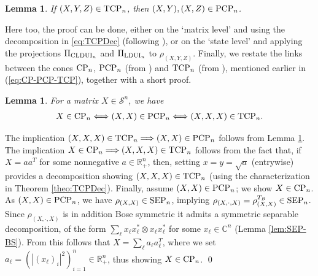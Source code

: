 \documentclass[11pt]{article}
\makeatletter
\newcommand{\R}{\ensuremath{\mathbb{R}}}   %
\newcommand{\C}{\ensuremath{\mathbb{C}}} %
\newcommand{\MS}{{\mathcal S}}
\newcommand{\PCP}{\text{\rm PCP}}
\newcommand{\TCP}{\text{\rm TCP}}
\newcommand{\SEP}{\text{\rm SEP}}
\newcommand{\CP}{\text{\rm CP}}
\newcommand{\CLDUI}{\text{\rm CLDUI}}
\newcommand{\LDUI}{\text{\rm LDUI}}
\newcommand{\ot}{\otimes}
\theoremstyle{plain}
\newtheorem{lemma}[satz]{Lemma}
\renewenvironment{proof}[1][\proofname]{%
  \par
  \pushQED{}%
  \normalfont
  \topsep6\p@\@plus6\p@
  \trivlist
  \item[\hskip\labelsep\itshape #1\@addpunct{.}]%
}{%
  \popQED
  \endtrivlist
}
\makeatother
\begin{document}
\begin{lemma}\label{lem:necCondTCP}\cite{SN-CLDUI}
    If $(X,Y,Z)\in \TCP_n$, then $(X,Y), (X,Z) \in\PCP_n$.%
\end{lemma}

Here too, the  proof can  be done, either  on the `matrix level'  and using the decomposition in \eqref{eq:TCPDec} (following \cite{SN-CLDUI}), 
or on the `state level' and applying the projections $\Pi_{\CLDUI_n}$ and $\Pi_{\LDUI_n}$ to $\rho_{(X,Y,Z)}$. %
Finally, we restate the links between the cones $\CP_n$, $\PCP_n$ (from \cite{JML-PCP}) and $\TCP_n$ (from \cite{SN-CLDUI}), mentioned earlier in (\ref{eq:CP-PCP-TCP}), together with a short proof. 

\begin{lemma}\label{lem:CP-PCP-TCP} \cite{SN-CLDUI}
For a matrix $X\in\MS^n$, we have 
\begin{align*}
X\in\CP_n \Longleftrightarrow (X,X)\in \PCP_n\Longleftrightarrow (X,X,X)\in \TCP_n.
\end{align*}
\end{lemma}

\begin{proof}
The implication $(X,X,X)\in\TCP_n\Longrightarrow (X,X)\in \PCP_n$ follows from Lemma \ref{lem:necCondTCP}.
The implication $X\in\CP_n\Longrightarrow (X,X,X)\in\TCP_n$ follows from the fact that, if $X=aa^T$ for some nonnegative  $a\in\R^n_+$, then, setting $x=y=\sqrt a $ (entrywise) provides a decomposition showing $(X,X,X)\in\TCP_n$ (using the characterization in Theorem \ref{theo:TCPDec}). 
Finally, assume $(X,X)\in \PCP_n$; we show $X\in\CP_n$. As $(X,X)\in \PCP_n$, we have $\rho_{(X,X)}\in\SEP_n$, implying $\rho_{(X,\cdot,X)}=\rho_{(X,X)}^{T_B}\in \SEP_n$. Since $\rho_{(X,\cdot,X)}$ is in addition Bose symmetric it admits a symmetric separable decomposition, of the form $\sum_\ell x_\ell x_\ell^*\ot x_\ell x_\ell^*$ for some $x_\ell\in \C^n$ (Lemma \ref{lem:SEP-BS}). From this follows that $X=\sum_\ell a_\ell a_\ell^T$, where we set $a_\ell =(|(x_\ell)_i|^2)_{i=1}^n\in\R^n_+$, thus showing $X\in\CP_n$.
\qed\end{proof}
\end{document}
